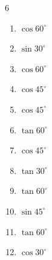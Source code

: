 \begin{multicols}{6}
\begin{enumerate}

  \item $\displaystyle \cos{60^\circ}$


  \item $\displaystyle \sin{30^\circ}$


  \item $\displaystyle \cos{60^\circ}$


  \item $\displaystyle \cos{45^\circ}$


  \item $\displaystyle \cos{45^\circ}$


  \item $\displaystyle \tan{60^\circ}$


  \item $\displaystyle \cos{45^\circ}$


  \item $\displaystyle \tan{30^\circ}$


\columnbreak %

  \item $\displaystyle \tan{60^\circ}$


  \item $\displaystyle \sin{45^\circ}$


  \item $\displaystyle \tan{60^\circ}$


  \item $\displaystyle \cos{30^\circ}$



\end{enumerate}
\end{multicols}
